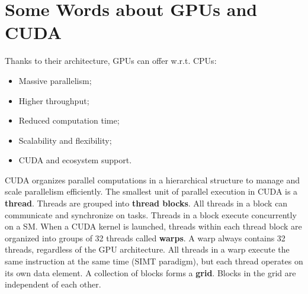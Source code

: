 \documentclass[conference]{IEEEtran}
\begin{document}
    \section{Some Words about GPUs and CUDA}
    Thanks to their architecture, GPUs can offer w.r.t. CPUs\cite{gpu101_lecture1}:
    \begin{itemize}
    	\item Massive parallelism;
    	\item Higher throughput;
    	\item Reduced computation time;
    	\item Scalability and flexibility;
    	\item CUDA and ecosystem support.
    \end{itemize}
    CUDA organizes parallel computations in a hierarchical structure to manage and scale parallelism efficiently. The smallest unit of parallel execution in CUDA is a \textbf{thread}. Threads are grouped into \textbf{thread blocks}. All threads in a block can communicate and synchronize on tasks. Threads in a block execute 
    concurrently on a SM. When a CUDA kernel is launched, threads within each thread block are organized into groups of 32 threads called \textbf{warps}. A warp always contains 32 threads, regardless of the GPU architecture. All threads in a warp execute the same instruction at the same time (SIMT paradigm), but each thread operates on its own data 
    element. A collection of blocks forms a \textbf{grid}. Blocks in the grid are independent of each other\cite{gpu101_lecture1}.
\end{document}

